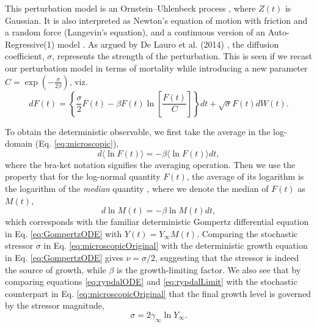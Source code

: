 \documentclass{article}
\begin{document}
This perturbation model is an Ornstein–Uhlenbeck process \cite{risken1996fokker}, where $Z(t)$ is Gaussian. It is also interpreted as Newton's equation of motion with friction and a random force (Langevin's equation), and a continuous version of an Auto-Regressive(1) model \cite{akaike1970statistical}. As argued by De Lauro et al. (2014) \cite{de2014stochastic}, the diffusion coefficient, $\sigma$, represents the strength of the perturbation. This is seen if we recast our perturbation model in terms of mortality while introducing a new parameter $C=\exp{(-\frac{\sigma}{2\beta})}$, viz. 
\begin{equation}
\label{eq:microscopicOriginal}
dF(t) = \left\{\frac{\sigma}{2}F(t) - \beta F(t)\ln\left[\frac{F(t)}{C}\right]\right\}dt + \sqrt{\sigma}F(t)dW(t).
\end{equation}

To obtain the deterministic observable, we first take the average in the log-domain (Eq. \ref{eq:microscopic}), 
\begin{equation}
d\langle\ln{F(t)}\rangle = -\beta \langle\ln{F(t)}\rangle dt,
\end{equation}
where the bra-ket notation signifies the averaging operation.
Then we use the property that for the log-normal quantity $F(t)$, the average of its logarithm is the logarithm of the \emph{median} quantity \cite{petroni2020gompertz}, where we denote the median of $F(t)$ as $M(t)$, 
\begin{equation}
\label{eq:medianGomp}
d\ln{M(t)} = -\beta \ln{M(t)} dt,
\end{equation}
which corresponds with the familiar deterministic Gompertz differential equation in Eq. \ref{eq:GompertzODE} with $Y(t) = Y_\infty M(t)$. 
Comparing the stochastic stressor $\sigma$ in Eq. \ref{eq:microscopicOriginal} with the deterministic growth equation in Eq. \ref{eq:GompertzODE} gives $\nu=\sigma/2$, suggesting that the stressor is indeed the source of growth, while $\beta$ is the growth-limiting factor. 
We also see that by comparing equations \ref{eq:rypdalODE} and \ref{eq:rypdalLimit} with the stochastic counterpart in Eq. \ref{eq:microscopicOriginal} that the final growth level is governed by the stressor magnitude,
\begin{equation}
\sigma = 2\gamma_{\infty}\ln{Y_{\infty}}.
\end{equation}
\end{document}
